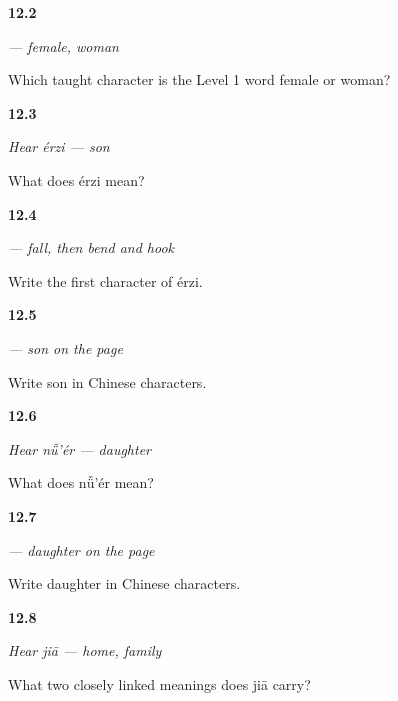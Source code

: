 \noindent\begin{minipage}[t]{\linewidth}
\raggedright
\hypertarget{review-ZH-C12-nu-meaning}{\textbf{12.2}} \emph{ — female, woman}\par
\small Which taught character is the Level 1 word female or woman?
\end{minipage}\par\medskip

\noindent\begin{minipage}[t]{\linewidth}
\raggedright
\hypertarget{review-ZH-C12-hear-erzi-meaning}{\textbf{12.3}} \emph{Hear \emph{érzi} — son}\par
\small What does érzi mean?
\end{minipage}\par\medskip

\noindent\begin{minipage}[t]{\linewidth}
\raggedright
\hypertarget{review-ZH-W12-er-write}{\textbf{12.4}} \emph{ — fall, then bend and hook}\par
\small Write the first character of érzi.
\end{minipage}\par\medskip

\noindent\begin{minipage}[t]{\linewidth}
\raggedright
\hypertarget{review-ZH-C12-erzi-write}{\textbf{12.5}} \emph{ — son on the page}\par
\small Write son in Chinese characters.
\end{minipage}\par\medskip

\noindent\begin{minipage}[t]{\linewidth}
\raggedright
\hypertarget{review-ZH-C12-hear-nuer-meaning}{\textbf{12.6}} \emph{Hear \emph{nǚ'ér} — daughter}\par
\small What does nǚ'ér mean?
\end{minipage}\par\medskip

\noindent\begin{minipage}[t]{\linewidth}
\raggedright
\hypertarget{review-ZH-C12-nuer-write}{\textbf{12.7}} \emph{ — daughter on the page}\par
\small Write daughter in Chinese characters.
\end{minipage}\par\medskip

\noindent\begin{minipage}[t]{\linewidth}
\raggedright
\hypertarget{review-ZH-C12-hear-jia-meaning}{\textbf{12.8}} \emph{Hear \emph{jiā} — home, family}\par
\small What two closely linked meanings does jiā carry?
\end{minipage}\par\medskip

